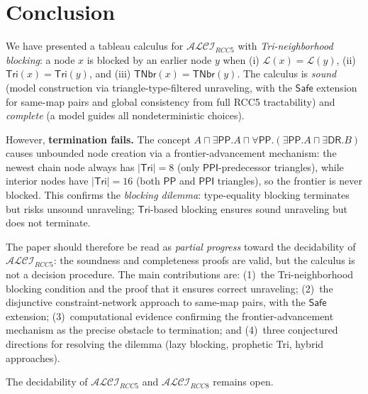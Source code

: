 \documentclass[a4paper,11pt]{article}
\theoremstyle{definition}
\newcommand{\ALCIRCC}[1]{\ensuremath{\mathcal{ALCI}_{\mathit{RCC#1}}}}
\newcommand{\DR}{\ensuremath{\mathsf{DR}}}
\newcommand{\PP}{\ensuremath{\mathsf{PP}}}
\newcommand{\PPI}{\ensuremath{\mathsf{PPI}}}
\newcommand{\Tri}{\ensuremath{\mathsf{Tri}}}
\newcommand{\TNbr}{\ensuremath{\mathsf{TNbr}}}
\newcommand{\Safe}{\ensuremath{\mathsf{Safe}}}
\newcommand{\LL}{\ensuremath{\mathcal{L}}}
\begin{document}
\section{Conclusion}\label{sec:conclusion}

We have presented a tableau calculus for $\ALCIRCC{5}$ with
\emph{Tri-neighborhood blocking}: a node $x$ is blocked by an
earlier node $y$ when (i) $\LL(x) = \LL(y)$, (ii) $\Tri(x) =
\Tri(y)$, and (iii) $\TNbr(x) = \TNbr(y)$.  The calculus is
\emph{sound} (model construction via triangle-type-filtered
unraveling, with the $\Safe$ extension for same-map pairs
and global consistency from full RCC5 tractability) and
\emph{complete} (a model guides all nondeterministic choices).

However, \textbf{termination fails.}  The concept
$A \sqcap \exists\PP.A \sqcap
\forall\PP.(\exists\PP.A \sqcap \exists\DR.B)$
causes unbounded node creation via a frontier-advancement
mechanism: the newest chain node always has $|\Tri| = 8$
(only $\PPI$-predecessor triangles), while interior nodes
have $|\Tri| = 16$ (both $\PP$ and $\PPI$ triangles), so
the frontier is never blocked.  This confirms the
\emph{blocking dilemma}: type-equality blocking terminates
but risks unsound unraveling; $\Tri$-based blocking
ensures sound unraveling but does not terminate.

The paper should therefore be read as \emph{partial progress}
toward the decidability of $\ALCIRCC{5}$: the soundness and
completeness proofs are valid, but the calculus is not a
decision procedure.  The main contributions are:
(1)~the Tri-neighborhood blocking condition and the proof
that it ensures correct unraveling;
(2)~the disjunctive constraint-network approach to same-map
pairs, with the $\Safe$ extension;
(3)~computational evidence confirming the frontier-advancement
mechanism as the precise obstacle to termination; and
(4)~three conjectured directions for resolving the dilemma
(lazy blocking, prophetic Tri, hybrid approaches).

The decidability of $\ALCIRCC{5}$ and $\ALCIRCC{8}$ remains
open.
\end{document}
